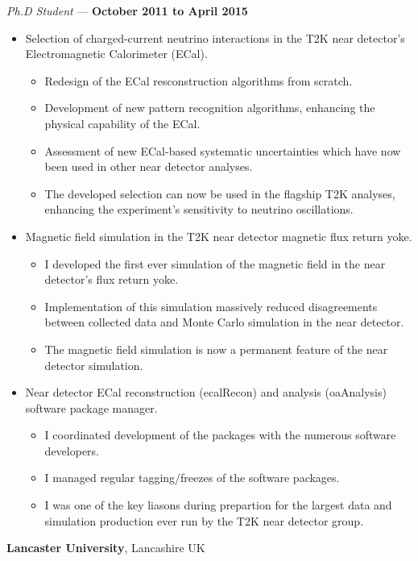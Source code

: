 \documentclass[margin,line]{res}
\begin{document}
\begin{resume}
\vspace{-.3cm}
{\em Ph.D Student} --- {\bf October 2011 to April 2015}%
\begin{itemize}
\item Selection of charged-current neutrino interactions in the T2K near detector's Electromagnetic Calorimeter (ECal).
\begin{itemize}
\item Redesign of the ECal resconstruction algorithms from scratch.
\item Development of new pattern recognition algorithms, enhancing the physical capability of the ECal.
\item Assessment of new ECal-based systematic uncertainties which have now been used in other near detector analyses.
\item The developed selection can now be used in the flagship T2K analyses, enhancing the experiment's sensitivity to neutrino oscillations.
\end{itemize}
\item Magnetic field simulation in the T2K near detector magnetic flux return yoke.
\begin{itemize}
\item I developed the first ever simulation of the magnetic field in the near detector's flux return yoke.
\item Implementation of this simulation massively reduced disagreements between collected data and Monte Carlo simulation in the near detector.
\item The magnetic field simulation is now a permanent feature of the near detector simulation.
\end{itemize}
\item Near detector ECal reconstruction (ecalRecon) and analysis (oaAnalysis) software package manager.
\begin{itemize}
\item I coordinated development of the packages with the numerous software developers.
\item I managed regular tagging/freezes of the software packages.
\item I was one of the key liasons during prepartion for the largest data and simulation production ever run by the T2K near detector group.
\end{itemize}
\end{itemize}

{\bf Lancaster University}, Lancashire UK


\end{resume}
\end{document}
